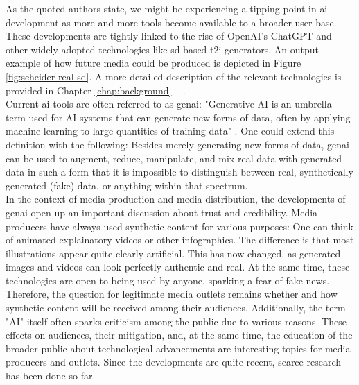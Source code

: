 \documentclass[
  a4paper,  %
  twoside,  %
  bibliography=totoc,
  headsepline,
  cleardoublepage=empty,
  parskip=half,
  draft=false
]{scrbook}
\begin{document}
As the quoted authors state, we might be experiencing a tipping point in \gls{ai} development as more and more tools become available to a broader user base. These developments are tightly linked to the rise of OpenAI's ChatGPT and other widely adopted technologies like \gls{sd}-based \gls{t2i} generators. An output example of how future media could be produced is depicted in Figure \ref{fig:scheider-real-sd}. A more detailed description of the relevant technologies is provided in Chapter \ref{chap:background} – . \\
Current \gls{ai} tools are often referred to as \gls{genai}: "Generative AI is an umbrella term used for AI systems that can generate new forms of data, often by applying machine learning to large quantities of training data" \cite[p. 7]{arguedasAutomatingDemocracyGenerative2023}. One could extend this definition with the following: Besides merely generating new forms of data, \gls{genai} can be used to augment, reduce, manipulate, and mix real data with generated data in such a form that it is impossible to distinguish between real, synthetically generated (fake) data, or anything within that spectrum. \\
In the context of media production and media distribution, the developments of \gls{genai} open up an important discussion about trust and credibility. Media producers have always used synthetic content for various purposes: One can think of animated explainatory videos or other infographics. The difference is that most illustrations appear quite clearly artificial. This has now changed, as generated images and videos can look perfectly authentic and real. At the same time, these technologies are open to being used by anyone, sparking a fear of fake news. Therefore, the question for legitimate media outlets remains whether and how synthetic content will be received among their audiences. Additionally, the term "AI" itself often sparks criticism among the public due to various reasons. These effects on audiences, their mitigation, and, at the same time, the education of the broader public about technological advancements are interesting topics for media producers and outlets. Since the developments are quite recent, scarce research has been done so far.
\end{document}
